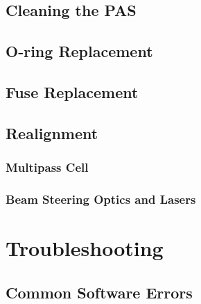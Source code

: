 \documentclass[]{book}
\begin{document}
\section{Cleaning the PAS}\label{cleaning-the-pas}

\section{O-ring Replacement}\label{o-ring-replacement}

\section{Fuse Replacement}\label{fuse-replacement}

\section{Realignment}\label{realignment}

\subsection{Multipass Cell}\label{multipass-cell}

\subsection{Beam Steering Optics and
Lasers}\label{beam-steering-optics-and-lasers}

\chapter{Troubleshooting}\label{troubleshooting}

\section{Common Software Errors}\label{common-software-errors}
\end{document}
